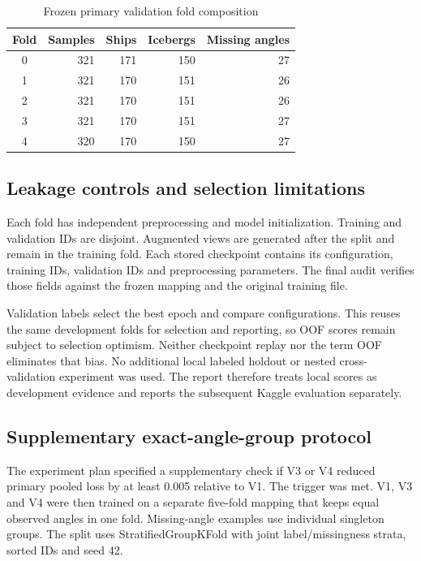 \documentclass[journal]{IEEEtran}
\begin{document}
\begin{table}[t]
\caption{Frozen primary validation fold composition}
\centering\begin{tabular}{crrrr}\toprule
Fold & Samples & Ships & Icebergs & Missing angles\\\midrule
0 & 321 & 171 & 150 & 27\\
1 & 321 & 170 & 151 & 26\\
2 & 321 & 170 & 151 & 26\\
3 & 321 & 170 & 151 & 27\\
4 & 320 & 170 & 150 & 27\\\bottomrule
\end{tabular}
\end{table}

\subsection{Leakage controls and selection limitations}
Each fold has independent preprocessing and model initialization. Training and validation IDs are disjoint. Augmented views are generated after the split and remain in the training fold. Each stored checkpoint contains its configuration, training IDs, validation IDs and preprocessing parameters. The final audit verifies those fields against the frozen mapping and the original training file.

Validation labels select the best epoch and compare configurations. This reuses the same development folds for selection and reporting, so OOF scores remain subject to selection optimism. Neither checkpoint replay nor the term OOF eliminates that bias. No additional local labeled holdout or nested cross-validation experiment was used. The report therefore treats local scores as development evidence and reports the subsequent Kaggle evaluation separately.

\subsection{Supplementary exact-angle-group protocol}
The experiment plan specified a supplementary check if V3 or V4 reduced primary pooled loss by at least 0.005 relative to V1. The trigger was met. V1, V3 and V4 were then trained on a separate five-fold mapping that keeps equal observed angles in one fold. Missing-angle examples use individual singleton groups. The split uses StratifiedGroupKFold with joint label/missingness strata, sorted IDs and seed 42.
\end{document}
